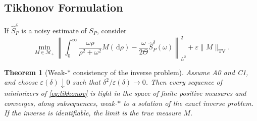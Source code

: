 \documentclass[11pt]{article}
\newtheorem{theorem}{Theorem}[section]
\newcommand{\TV}{\operatorname{TV}}
\newcommand{\dd}{\,\mathrm{d}}
\newcommand{\REV}{}
\begin{document}
\subsection{Tikhonov Formulation}
If $\widehat{S}_P^\delta$ is a noisy estimate of $S_P$, consider
\begin{equation}\label{eq:tikhonov}
  \min_{M\in\mathcal{M}_+}
  \left\|
    \int_0^\infty \frac{\omega\rho}{\rho^2+\omega^2}M(\dd\rho)
    -\frac{\omega}{2\Theta}\widehat{S}_P^\delta(\omega)
  \right\|_{L^2}^2
  +\varepsilon\|M\|_{\TV}.
\end{equation}

\begin{theorem}[Weak-$*$ consistency of the inverse problem]\label{thm:inverse}\REV
Assume A0 and C1, and choose $\varepsilon(\delta)\downarrow 0$ such that $\delta^2/\varepsilon(\delta)\to 0$. Then every sequence of minimizers of \cref{eq:tikhonov} is tight in the space of finite positive measures and converges, along subsequences, weak-$*$ to a solution of the exact inverse problem. If the inverse is identifiable, the limit is the true measure $M$.
\end{theorem}
\end{document}
